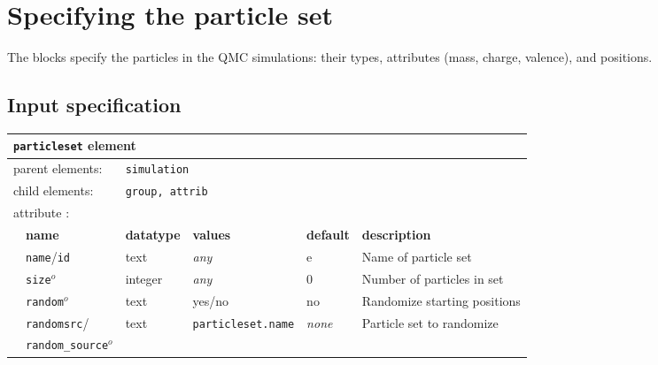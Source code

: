 \section{Specifying the particle set}
\label{sec:particleset}


The  blocks specify the particles in the QMC simulations: their types, attributes (mass, charge, valence), and positions.   

\subsection{Input specification}
\begin{table}[h]
\begin{center}
\begin{tabularx}{\textwidth}{l l l l l X }
\hline
\multicolumn{6}{l}{\texttt{particleset} element} \\
\hline
\multicolumn{2}{l}{parent elements:} & \multicolumn{4}{l}{\texttt{simulation}}\\
\multicolumn{2}{l}{child  elements:} & \multicolumn{4}{l}{\texttt{group, attrib}}\\
\multicolumn{2}{l}{attribute      :} & \multicolumn{4}{l}{}\\
   &   \bfseries name            & \bfseries datatype & \bfseries values & \bfseries default   & \bfseries description \\
   &   \texttt{name}/\texttt{id}   &  text              &  \textit{any}    &  e                & Name of particle set  \\
   &   \texttt{size}$^o$           &  integer           &  \textit{any}    &  0                & Number of particles in set \\
   &   \texttt{random}$^o$         &  text              &  yes/no          &  no               & Randomize starting positions \\
   &   \texttt{randomsrc}/         &  text     & \texttt{particleset.name} & \textit{none}     & Particle set to randomize  \\
   &   \texttt{random\_source}$^o$ &                    &                  &                   &                       \\
  \hline
\end{tabularx}
\end{center}
\end{table}


